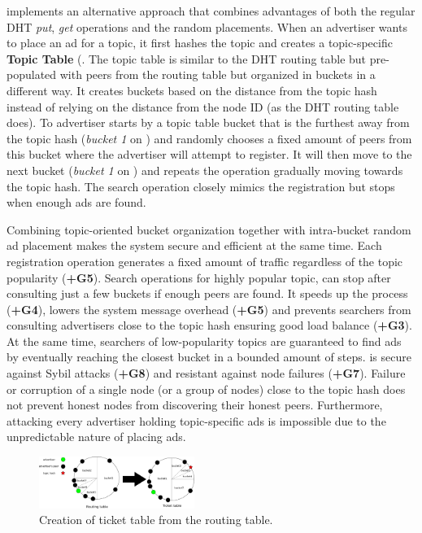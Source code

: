 \sysname implements an alternative approach that combines advantages of both the regular DHT \emph{put}, \emph{get} operations and the random placements. When an advertiser wants to place an ad for a topic, it first hashes the topic and creates a topic-specific \textbf{Topic Table} (. The topic table is similar to the DHT routing table but pre-populated with peers from the routing table but organized in buckets in a different way. It creates buckets based on the distance from the topic hash instead of relying on the distance from the node ID (as the DHT routing table does). To advertiser starts by a topic table bucket that is the furthest away from the topic hash (\ie \emph{bucket 1} on ) and randomly chooses a fixed amount of peers from this bucket where the advertiser will attempt to register. It will then move to the next bucket (\ie \emph{bucket 1} on ) and repeats the operation gradually moving towards the topic hash. The search operation closely mimics the registration but stops when enough ads are found. 

Combining topic-oriented bucket organization together with intra-bucket random ad placement makes the system secure and efficient at the same time. Each registration operation generates a fixed amount of traffic regardless of the topic popularity (\textbf{+G5}). Search operations for highly popular topic, can stop after consulting just a few buckets if enough peers are found. It speeds up the process (\textbf{+G4}), lowers the system message overhead (\textbf{+G5}) and prevents searchers from consulting advertisers close to the topic hash ensuring good load balance (\textbf{+G3}). At the same time, searchers of low-popularity topics are guaranteed to find ads by eventually reaching the closest bucket in a bounded amount of steps. \sysname is secure against Sybil attacks (\textbf{+G8}) and resistant against node failures (\textbf{+G7}). Failure or corruption of a single node (or a group of nodes) close to the topic hash does not prevent honest nodes from discovering their honest peers. Furthermore, attacking every advertiser holding topic-specific ads is impossible due to the unpredictable nature of placing ads. 


\begin{figure}
    \includegraphics[width=0.45\textwidth]{img/ticket_table}
    \caption{Creation of ticket table from the routing table.}
    \label{fig:ticket_table}
 \end{figure}
 
